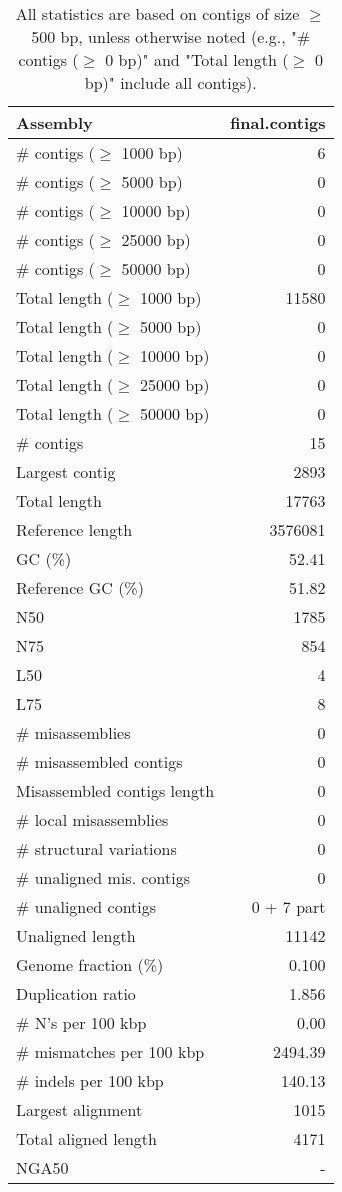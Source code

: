 \documentclass[12pt,a4paper]{article}
\begin{document}
\begin{table}[ht]
\begin{center}
\caption{All statistics are based on contigs of size $\geq$ 500 bp, unless otherwise noted (e.g., "\# contigs ($\geq$ 0 bp)" and "Total length ($\geq$ 0 bp)" include all contigs).}
\begin{tabular}{|l*{1}{|r}|}
\hline
Assembly & final.contigs \\ \hline
\# contigs ($\geq$ 1000 bp) & 6 \\ \hline
\# contigs ($\geq$ 5000 bp) & 0 \\ \hline
\# contigs ($\geq$ 10000 bp) & 0 \\ \hline
\# contigs ($\geq$ 25000 bp) & 0 \\ \hline
\# contigs ($\geq$ 50000 bp) & 0 \\ \hline
Total length ($\geq$ 1000 bp) & 11580 \\ \hline
Total length ($\geq$ 5000 bp) & 0 \\ \hline
Total length ($\geq$ 10000 bp) & 0 \\ \hline
Total length ($\geq$ 25000 bp) & 0 \\ \hline
Total length ($\geq$ 50000 bp) & 0 \\ \hline
\# contigs & 15 \\ \hline
Largest contig & 2893 \\ \hline
Total length & 17763 \\ \hline
Reference length & 3576081 \\ \hline
GC (\%) & 52.41 \\ \hline
Reference GC (\%) & 51.82 \\ \hline
N50 & 1785 \\ \hline
N75 & 854 \\ \hline
L50 & 4 \\ \hline
L75 & 8 \\ \hline
\# misassemblies & 0 \\ \hline
\# misassembled contigs & 0 \\ \hline
Misassembled contigs length & 0 \\ \hline
\# local misassemblies & 0 \\ \hline
\# structural variations & 0 \\ \hline
\# unaligned mis. contigs & 0 \\ \hline
\# unaligned contigs & 0 + 7 part \\ \hline
Unaligned length & 11142 \\ \hline
Genome fraction (\%) & 0.100 \\ \hline
Duplication ratio & 1.856 \\ \hline
\# N's per 100 kbp & 0.00 \\ \hline
\# mismatches per 100 kbp & 2494.39 \\ \hline
\# indels per 100 kbp & 140.13 \\ \hline
Largest alignment & 1015 \\ \hline
Total aligned length & 4171 \\ \hline
NGA50 & - \\ \hline
\end{tabular}
\end{center}
\end{table}
\end{document}

